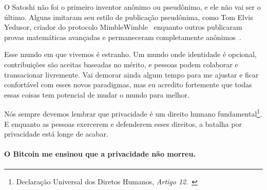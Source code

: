 O Satoshi não foi o primeiro inventor anônimo ou pseudônimo, e ele não vai ser o último.
Alguns imitaram seu estilo de publicação pseudônima, como Tom Elvis Yedusor, criador do protocolo 
MimbleWimble~\cite{mimblewimble-origin} enquanto outros publicaram provas matemáticas avançadas 
e permaneceram completamente anônimos~\cite{4chan-math}.

Esse mundo em que vivemos é estranho. Um mundo onde identidade é opcional, 
contribuições são aceitas baseadas no mérito, e pessoas podem colaborar e transacionar livremente.
Vai demorar ainda algum tempo para me ajustar e ficar confortável com esses novos paradigmas, mas eu acredito
fortemente que todas essas coisas tem potencial de mudar o mundo para melhor.

Nós sempre devemos lembrar que privacidade é um direito humano fundamental\footnote{Declaração Universal dos Diretos Humanos, \textit{Artigo 12}.~\cite{article12}}. 
E enquanto as pessoas exercerem e defenderem esses direitos, a batalha por privacidade está longe de acabar.

\paragraph{O Bitcoin me ensinou que a privacidade não morreu.}

%
%
%
%
